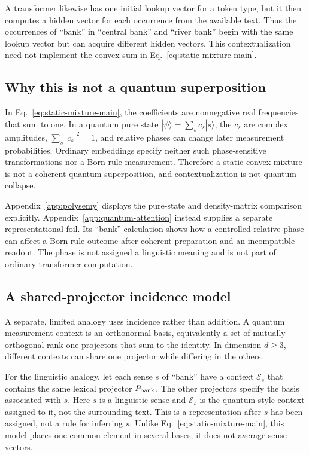 \documentclass[
  aps,
  reprint,
  superscriptaddress,
  floatfix,
  nofootinbib,
  longbibliography
]{revtex4-2}
\begin{document}
A transformer likewise has one initial lookup vector for a token type, but it
then computes a hidden vector for each occurrence from the available text.
Thus the occurrences of ``bank'' in ``central bank'' and ``river bank'' begin
with the same lookup vector but can acquire different hidden vectors.  This
contextualization need not implement the convex sum in
Eq.~\eqref{eq:static-mixture-main}.

\subsection{Why this is not a quantum superposition}

In Eq.~\eqref{eq:static-mixture-main}, the coefficients are nonnegative real
frequencies that sum to one.  In a quantum pure state
$|\psi\rangle=\sum_s c_s|s\rangle$, the $c_s$ are complex amplitudes,
$\sum_s|c_s|^2=1$, and relative phases can change later measurement
probabilities.  Ordinary embeddings specify neither such phase-sensitive
transformations nor a Born-rule measurement.  Therefore a static convex
mixture is not a coherent quantum superposition, and contextualization is not
quantum collapse.

Appendix~\ref{app:polysemy} displays the pure-state and density-matrix
comparison explicitly.  Appendix~\ref{app:quantum-attention} instead supplies
a separate representational foil.  Its ``bank'' calculation shows how a
controlled relative phase can affect a Born-rule outcome after coherent
preparation and an incompatible readout.  The phase is not assigned a
linguistic meaning and is not part of ordinary transformer computation.

\subsection{A shared-projector incidence model}

A separate, limited analogy uses incidence rather than addition.  A
quantum measurement context is an orthonormal basis, equivalently a set of
mutually orthogonal rank-one projectors that sum to the identity.  In
dimension $d\geq3$, different contexts can share one projector while differing
in the others.

For the linguistic analogy, let each sense $s$ of ``bank'' have a context
$\mathcal E_s$ that contains the same lexical projector $P_{\rm bank}$.  The
other projectors specify the basis associated with $s$.  Here $s$ is a
linguistic sense and $\mathcal E_s$ is the quantum-style context assigned to
it, not the surrounding text.  This is a representation after $s$ has been
assigned, not a rule for inferring $s$.  Unlike
Eq.~\eqref{eq:static-mixture-main}, this model places one common element in
several bases; it does not average sense vectors.
\end{document}
